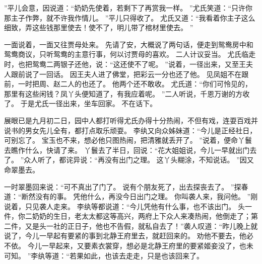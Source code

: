 ”平儿会意，因说道：“奶奶先使着，若剩下了再赏我一样。
”尤氏笑道：“只许你那主子作弊，就不许我作情儿。
”平儿只得收了。
尤氏又道：“我看着你主子这么细致，弄这些钱那里使去！使不了，明儿带了棺材里使去。
”\par
一面说着，一面又往贾母处来。
先请了安，大概说了两句话，便走到鸳鸯房中和鸳鸯商议，只听鸳鸯的主意行事，何以讨贾母的喜欢。
二人计议妥当。
尤氏临走时，也把鸳鸯二两银子还他，说：“这还使不了呢。
”说着，一径出来，又至王夫人跟前说了一回话。
因王夫人进了佛堂，把彩云一分也还了他。
见凤姐不在跟前，一时把周、赵二人的也还了。
他两个还不敢收。
尤氏道：“你们可怜见的，那里有这些闲钱？凤丫头便知道了，有我应着呢。
”二人听说，千恩万谢的方收了。
于是尤氏一径出来，坐车回家。
不在话下。
\par
展眼已是九月初二日，园中人都打听得尤氏办得十分热闹，不但有戏，连耍百戏并说书的男女先儿全有，都打点取乐顽耍。
李纨又向众姊妹道：“今儿是正经社日，可别忘了。
宝玉也不来，想必他只图热闹，把清雅就丢开了。
”说着，便命丫鬟去瞧作什么，快请了来。
丫鬟去了半日，回说：“花大姐姐说，今儿一早就出门去了。
”众人听了，都诧异说：“再没有出门之理。
这丫头糊涂，不知说话。
”因又命翠墨去。
\par
一时翠墨回来说：“可不真出了门了。
说有个朋友死了，出去探丧去了。
”探春道：“断然没有的事。
凭他什么，再没今日出门之理。
你叫袭人来，我问他。
”刚说着，只见袭人走来。
李纨等都说道：“今儿凭他有什么事，也不该出门。
头一件，你二奶奶的生日，老太太都这等高兴，两府上下众人来凑热闹，他倒走了；第二件，又是头一社的正日子，他也不告假，就私自去了！”袭人叹道：“昨儿晚上就说了，今儿一早起有要紧的事到北静王府里去，就赶回来的。
劝他不要去，他必不依。
今儿一早起来，又要素衣裳穿，想必是北静王府里的要紧姬妾没了，也未可知。
”李纨等道：“若果如此，也该去走走，只是也该回来了。
